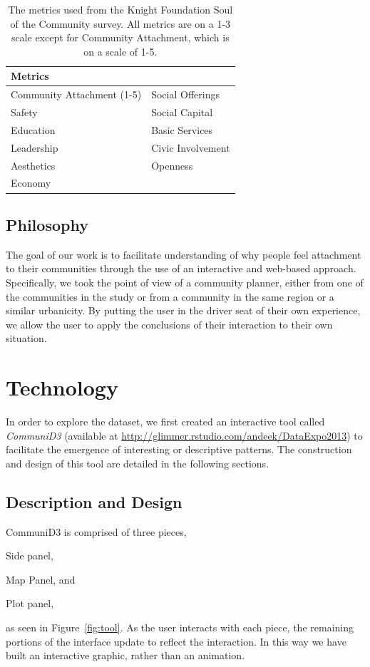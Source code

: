 \documentclass[11pt]{article}\usepackage{knitr}
\begin{document}
\begin{table}[H]
\centering
\begin{tabular}{l l}
\hline
Metrics & \\
\hline
Community Attachment (1-5) & Social Offerings \\
Safety & Social Capital \\
Education & Basic Services \\
Leadership & Civic Involvement \\
Aesthetics & Openness \\
Economy &  \\
\hline
\end{tabular}
\caption{\label{tab:metrics} The metrics used from the Knight Foundation Soul of the Community survey. All metrics are on a 1-3 scale except for Community Attachment, which is on a scale of 1-5.}
\end{table}

\subsection{Philosophy}
The goal of our work is to facilitate understanding of why people feel attachment to their communities through the use of an interactive and web-based approach. Specifically, we took the point of view of a community planner, either from one of the communities in the study or from a community in the same region or a similar urbanicity. By putting the user in the driver seat of their own experience, we allow the user to apply the conclusions of their interaction to their own situation.


\section{Technology}

In order to explore the dataset, we first created an interactive tool called {\it CommuniD3} (available at \url{http://glimmer.rstudio.com/andeek/DataExpo2013}) to facilitate the emergence of interesting or descriptive patterns. The construction and design of this tool are detailed in the following sections.

\subsection{Description and Design}
CommuniD3 is comprised of three pieces, \begin{inparaenum}[(1)]
\item Side panel, 
\item Map Panel, and
\item Plot panel,
\end{inparaenum}
as seen in Figure~\ref{fig:tool}.
As the user interacts with each piece, the remaining portions of the interface update to reflect the interaction. In this way we have built an interactive graphic, rather than an animation.
\end{document}

